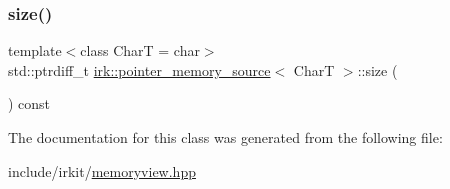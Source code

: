 \mbox{\label{classirk_1_1pointer__memory__source_a6eafc7470d86718ade875dcd87439a2b}} 
\subsubsection{\texorpdfstring{size()}{size()}}
{\footnotesize\ttfamily template$<$class CharT  = char$>$ \\
std\+::ptrdiff\+\_\+t \mbox{\hyperlink{classirk_1_1pointer__memory__source}{irk\+::pointer\+\_\+memory\+\_\+source}}$<$ CharT $>$\+::size (\begin{DoxyParamCaption}{ }\end{DoxyParamCaption}) const\hspace{0.3cm}{\ttfamily [inline]}}



The documentation for this class was generated from the following file\+:\begin{DoxyCompactItemize}
\item 
include/irkit/\mbox{\hyperlink{memoryview_8hpp}{memoryview.\+hpp}}\end{DoxyCompactItemize}
